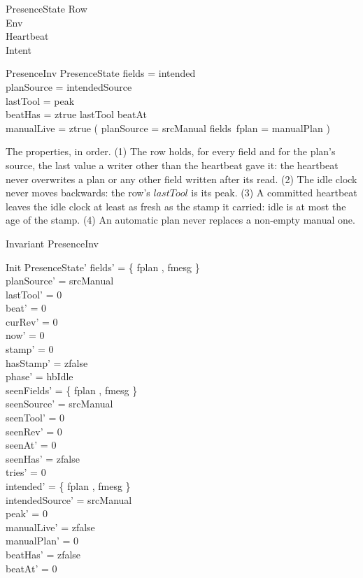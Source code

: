 \documentclass[a4paper,10pt,fleqn]{article}
\begin{document}
\begin{schema}{PresenceState}
  Row \\
  Env \\
  Heartbeat \\
  Intent
\end{schema}

\begin{schema}{PresenceInv}
  PresenceState
  \where
  fields = intended \\
  planSource = intendedSource \\
  lastTool = peak \\
  beatHas = ztrue \implies lastTool \geq beatAt \\
  manualLive = ztrue \implies
    ( planSource = srcManual \land fields~fplan = manualPlan )
\end{schema}

The properties, in order.  (1) The row holds, for every field and for the
plan's source, the last value a writer other than the heartbeat gave it: the
heartbeat never overwrites a plan or any other field written after its read.
(2) The idle clock never moves backwards: the row's $lastTool$ is its peak.
(3) A committed heartbeat leaves the idle clock at least as fresh as the stamp
it carried: idle is at most the age of the stamp.  (4) An automatic plan never
replaces a non-empty manual one.

\begin{schema}{Invariant}
  PresenceInv
\end{schema}

\begin{schema}{Init}
  PresenceState'
  \where
  fields' = \{ fplan , fmesg  \} \\
  planSource' = srcManual \\
  lastTool' = 0 \\
  beat' = 0 \\
  curRev' = 0 \\
  now' = 0 \\
  stamp' = 0 \\
  hasStamp' = zfalse \\
  phase' = hbIdle \\
  seenFields' = \{ fplan , fmesg  \} \\
  seenSource' = srcManual \\
  seenTool' = 0 \\
  seenRev' = 0 \\
  seenAt' = 0 \\
  seenHas' = zfalse \\
  tries' = 0 \\
  intended' = \{ fplan , fmesg  \} \\
  intendedSource' = srcManual \\
  peak' = 0 \\
  manualLive' = zfalse \\
  manualPlan' = 0 \\
  beatHas' = zfalse \\
  beatAt' = 0
\end{schema}
\end{document}

